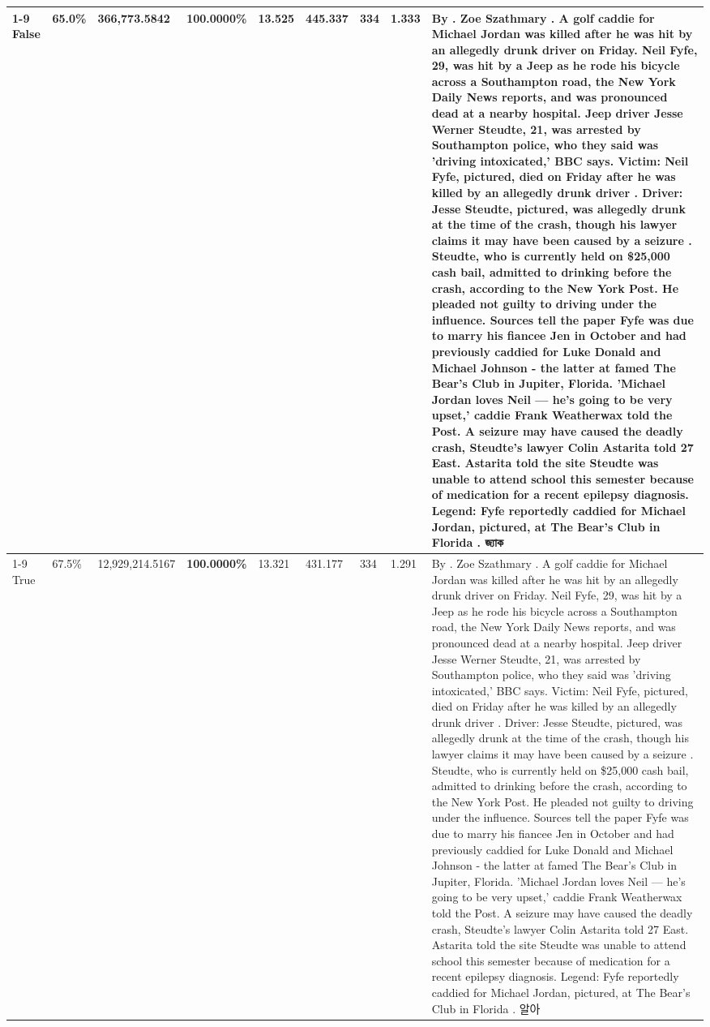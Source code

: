 \begin{table}[H]
\begin{tabular}{lllrlllll}
\cline{1-9}
False & 65.0\% & 366,773.5842 & \bfseries \color{red} 100.0000\% & 13.525 & 445.337 & 334 & 1.333 & By . Zoe Szathmary . A golf caddie for Michael Jordan was killed after he was hit by an allegedly drunk driver on Friday. Neil Fyfe, 29, was hit by a Jeep as he rode his bicycle across a Southampton road, the New York Daily News reports, and was pronounced dead at a nearby hospital. Jeep driver Jesse Werner Steudte, 21, was arrested by Southampton police, who they said was 'driving intoxicated,' BBC says. Victim: Neil Fyfe, pictured, died on Friday after he was killed by an allegedly drunk driver . Driver: Jesse Steudte, pictured, was allegedly drunk at the time of the crash, though his lawyer claims it may have been caused by a seizure . Steudte, who is currently held on \$25,000 cash bail, admitted to drinking before the crash, according to the New York Post. He pleaded not guilty to driving under the influence. Sources tell the paper Fyfe was due to marry his fiancee Jen in October and had previously caddied for Luke Donald and Michael Johnson - the latter at famed The Bear's Club in Jupiter, Florida. 'Michael Jordan loves Neil — he’s going to be very upset,' caddie Frank Weatherwax told the Post. A seizure may have caused the deadly crash, Steudte's lawyer Colin Astarita told 27 East. Astarita told the site Steudte was unable to attend school this semester because of medication for a recent epilepsy diagnosis. Legend: Fyfe reportedly caddied for Michael Jordan, pictured, at The Bear's Club in Florida . জ্যাক \\
\cline{1-9}
True & 67.5\% & 12,929,214.5167 & \bfseries \color{red} 100.0000\% & 13.321 & 431.177 & 334 & 1.291 & By . Zoe Szathmary . A golf caddie for Michael Jordan was killed after he was hit by an allegedly drunk driver on Friday. Neil Fyfe, 29, was hit by a Jeep as he rode his bicycle across a Southampton road, the New York Daily News reports, and was pronounced dead at a nearby hospital. Jeep driver Jesse Werner Steudte, 21, was arrested by Southampton police, who they said was 'driving intoxicated,' BBC says. Victim: Neil Fyfe, pictured, died on Friday after he was killed by an allegedly drunk driver . Driver: Jesse Steudte, pictured, was allegedly drunk at the time of the crash, though his lawyer claims it may have been caused by a seizure . Steudte, who is currently held on \$25,000 cash bail, admitted to drinking before the crash, according to the New York Post. He pleaded not guilty to driving under the influence. Sources tell the paper Fyfe was due to marry his fiancee Jen in October and had previously caddied for Luke Donald and Michael Johnson - the latter at famed The Bear's Club in Jupiter, Florida. 'Michael Jordan loves Neil — he’s going to be very upset,' caddie Frank Weatherwax told the Post. A seizure may have caused the deadly crash, Steudte's lawyer Colin Astarita told 27 East. Astarita told the site Steudte was unable to attend school this semester because of medication for a recent epilepsy diagnosis. Legend: Fyfe reportedly caddied for Michael Jordan, pictured, at The Bear's Club in Florida . 알아 \\

\end{tabular}
\end{table}
